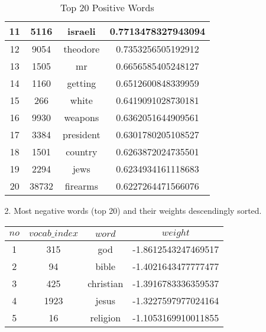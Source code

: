 \documentclass[twoside]{homework}
\begin{document}
\begin{itemize}
\begin{itemize}
\begin{table}[h!]
\begin{tabular}{||c c c c||}
                    \hline
                    11 & 5116 & israeli & 0.7713478327943094\\
                    \hline
                    12 & 9054 & theodore & 0.7353256505192912\\
                    \hline
                    13 & 1505 & mr & 0.6656585405248127\\
                    \hline
                    14 & 1160 & getting & 0.6512600848339959\\
                    \hline
                    15 & 266 & white & 0.6419091028730181\\
                    \hline
                    16 & 9930 & weapons & 0.6362051644909561\\
                    \hline
                    17 & 3384 & president & 0.6301780205108527\\
                    \hline
                    18 & 1501 & country & 0.6263872024735501\\
                    \hline
                    19 & 2294 & jews & 0.6234934161118683\\
                    \hline
                    20 & 38732 & firearms & 0.6227264471566076\\
                    \hline
                \end{tabular}
                \caption{Top 20 Positive Words}
                \label{table:3}
            \end{table}
            \newpage
            \item [2.] Most negative words (top 20) and their weights descendingly sorted.
            \begin{table}[h!]
                \centering
                \begin{tabular}{||c c c c||}
                    \hline
                    $no$ & $vocab\_index$ & $word$ & $weight$ \\ [1ex]
                    \hline\hline
                    1 & 315 & god & -1.8612543247469517\\
                \hline
                2 & 94 & bible & -1.4021643477777477\\
                \hline
                3 & 425 & christian & -1.3916783336359537\\
                \hline
                4 & 1923 & jesus & -1.3227597977024164\\
                \hline
                5 & 16 & religion & -1.1053169910011855\\

\end{tabular}
\end{table}
\end{itemize}
\end{itemize}
\end{document}
